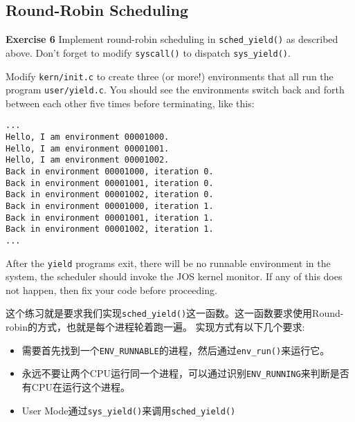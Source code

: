 \documentclass[11pt]{article}
\begin{document}
\subsection{Round-Robin Scheduling}
\begin{framed}
\noindent\textbf{Exercise 6} Implement round-robin scheduling in \lstinline|sched_yield()| as described above. Don't forget to modify \lstinline|syscall()| to dispatch \lstinline|sys_yield()|.

Modify \lstinline|kern/init.c| to create three (or more!) environments that all run the program \lstinline|user/yield.c|. You should see the environments switch back and forth between each other five times before terminating, like this:

\begin{lstlisting}[aboveskip=-1.5em,frame=none]
...
Hello, I am environment 00001000.
Hello, I am environment 00001001.
Hello, I am environment 00001002.
Back in environment 00001000, iteration 0.
Back in environment 00001001, iteration 0.
Back in environment 00001002, iteration 0.
Back in environment 00001000, iteration 1.
Back in environment 00001001, iteration 1.
Back in environment 00001002, iteration 1.
...
\end{lstlisting}

After the \lstinline|yield| programs exit, there will be no runnable environment in the system, the scheduler should invoke the JOS kernel monitor. If any of this does not happen, then fix your code before proceeding.
\end{framed}

这个练习就是要求我们实现\lstinline|sched_yield()|这一函数。这一函数要求使用Round-robin的方式，也就是每个进程轮着跑一遍。
实现方式有以下几个要求:
\begin{itemize}
\item 需要首先找到一个\lstinline|ENV_RUNNABLE|的进程，然后通过\lstinline|env_run()|来运行它。
\item 永远不要让两个CPU运行同一个进程，可以通过识别\lstinline|ENV_RUNNING|来判断是否有CPU在运行这个进程。
\item User Mode通过\lstinline|sys_yield()|来调用\lstinline|sched_yield()|
\end{itemize}
\end{document}
